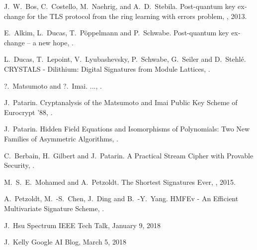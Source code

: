 \documentclass[a4paper,11pt]{article}
\begin{document}
\begin{otherlanguage}{english}
\begin{multicols}{2}
\begin{thebibliography}{1}
J.~W.~Bos, C.~Costello, M.~Naehrig, and A.~D.~Stebila.
\newblock Post-quantum key exchange for the TLS protocol from the ring
learning with errors problem,
, 2013.

E.~Alkim, L.~Ducas, T.~Pöppelmann and P.~Schwabe.
\newblock Post-quantum key exchange – a new hope,
.

L.~Ducas, T.~Lepoint, V.~Lyubashevsky, P.~Schwabe, G.~Seiler and D.~Stehlé.
\newblock CRYSTALS - Dilithium: Digital Signatures from Module Lattices,
.

?.~Matsumoto and ?.~Imai.
\newblock ...,
.

J.~Patarin.
\newblock Cryptanalysis of the Matsumoto and Imai Public Key Scheme of Eurocrypt '88,
.

J.~Patarin.
\newblock Hidden Field Equations and Isomorphisms of Polynomials: Two New Families of Asymmetric Algorithms,
.

C.~Berbain, H.~Gilbert and J.~Patarin.
\newblock A Practical Stream Cipher with Provable Security,
.

M.~S.~E.~Mohamed and A.~Petzoldt.
\newblock The Shortest Signatures Ever,
, 2015.

A.~Petzoldt, M.~-S.~Chen, J.~Ding and B.~-Y.~Yang.
\newblock HMFEv - An Efficient Multivariate Signature Scheme,
.

  J.~Hsu
  \newblock Spectrum IEEE Tech Talk, January 9, 2018

  J.~Kelly
  \newblock Google AI Blog, March 5, 2018
  
\end{thebibliography}


\end{multicols}



\end{otherlanguage}
\end{document}
